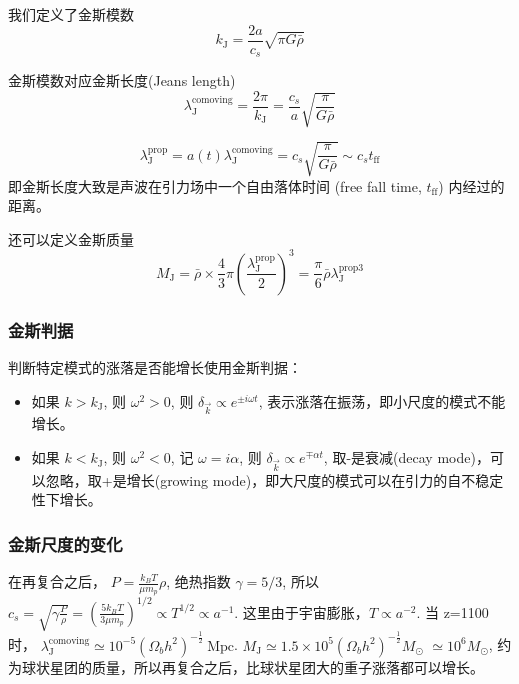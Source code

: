 \documentclass[12pt]{ctexart}
\begin{document}
我们定义了金斯模数
\begin{equation}
    k_\text{J} = \frac{2a}{c_s} \sqrt{\pi G \bar{\rho}}
\end{equation}

金斯模数对应金斯长度(Jeans length)
\begin{equation}
    \lambda_\text{J}^\text{comoving} = \frac{2\pi }{k_\text{J}} = \frac{c_s}{a} \sqrt{\frac{\pi}{G \bar{\rho}} }
\end{equation}

\begin{equation}
    \lambda_\text{J}^\text{prop} = a(t)\lambda_\text{J}^\text{comoving} = c_s\sqrt{\frac{\pi}{G\bar{\rho}}} \sim c_s t_\text{ff}
\end{equation}
即金斯长度大致是声波在引力场中一个自由落体时间 (free fall time, $t_\text{ff}$) 内经过的距离。

还可以定义金斯质量
\begin{equation}
    M_\text{J} = \bar{\rho} \times \frac{4}{3} \pi \left(\frac{\lambda_\text{J}^\text{prop}}{2}\right)^3  = \frac{\pi}{6}\bar{\rho} \lambda_\text{J}^{\text{prop} 3}
\end{equation}

\subsubsection{金斯判据}
判断特定模式的涨落是否能增长使用金斯判据：
\begin{itemize}
    \item 如果 $k>k_\text{J}$, 则 $\omega^2>0$, 则 $\delta_{\vec{k}}\propto e^{\pm i\omega t}$, 表示涨落在振荡，即小尺度的模式不能增长。
    \item 如果 $k<k_\text{J}$, 则 $\omega^2<0$, 记 $\omega=i\alpha$, 则 $\delta_{\vec{k}}\propto e^{\mp \alpha t}$, 取-是衰减(decay mode)，可以忽略，取+是增长(growing mode)，即大尺度的模式可以在引力的自不稳定性下增长。
\end{itemize}

\subsubsection{金斯尺度的变化}
在再复合之后，
$P=\frac{k_{B}T}{\mu m_p}\rho$,
绝热指数 $\gamma =5/3$, 
所以 $c_s=\sqrt{\gamma \frac{P}{\rho}} =\left(\frac{5k_B T}{3\mu m_p}\right)^{1/2} \propto T^{1/2} \propto a^{-1}$. 这里由于宇宙膨胀，$T\propto a^{-2}$.
当 z=1100 时，
$\lambda_\text{J}^\text{comoving} \simeq 10^{-5}  \left(\Omega_b h^2\right)^{-\frac{1}{2}} \mathrm{~Mpc}$.
$M_\text{J} \simeq 1.5\times 10^5 \left(\Omega_b h^2\right)^{-\frac{1}{2}} M_\odot$ 
$\simeq 10^6 M_\odot$, 
约为球状星团的质量，所以再复合之后，比球状星团大的重子涨落都可以增长。
\end{document}
